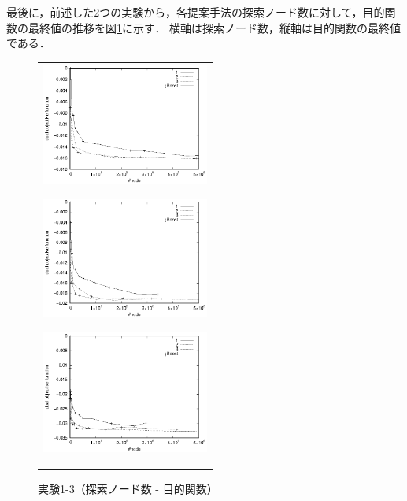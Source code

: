 最後に，前述した2つの実験から，各提案手法の探索ノード数に対して，目的関数の最終値の推移を図\ref{1-3}に示す．
横軸は探索ノード数，縦軸は目的関数の最終値である．
\begin{figure}[t]
	\begin{center}
		\begin{tabular}{c}
			\begin{minipage}{0.33\hsize}
				\begin{center}
					\includegraphics[width=55mm]{cpdb/purpose_node_1.eps}
				\end{center}
				\vspace{0.5cm}
				\subcaption{$\nu = 0.1$}
				\label{fig:7}
			\end{minipage}
			\begin{minipage}{0.33\hsize}
				\begin{center}
					\includegraphics[width=55mm]{cpdb/purpose_node_3.eps}
				\end{center}
				\vspace{0.5cm}
				\subcaption{$\nu = 0.3$}
				\label{fig:8}
			\end{minipage}
			\begin{minipage}{0.33\hsize}
				\begin{center}
					\includegraphics[width=55mm]{cpdb/purpose_node_5.eps}
				\end{center}
				\vspace{0.5cm}
				\subcaption{$\nu = 0.5$}
				\label{fig:9}
			\end{minipage}
		\end{tabular}
		\caption{実験1-3（探索ノード数 - 目的関数）}
		\label{1-3}
	\end{center}
\end{figure}

